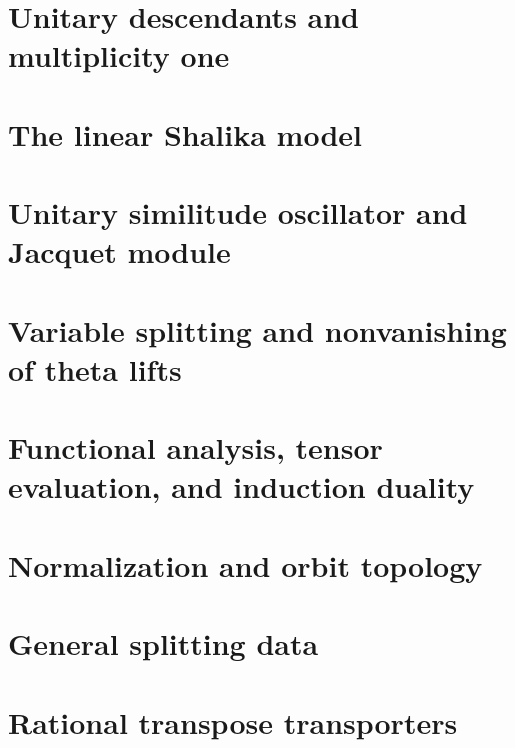 \documentclass[11pt,reqno]{amsart}
\begin{document}
\section{Unitary descendants and multiplicity one}\label{sec:unitary-descendants}

\section{The linear Shalika model}\label{sec:gl-shalika}

\section{Unitary similitude oscillator and Jacquet module}\label{sec:gu-transfer}

\section{Variable splitting and nonvanishing of theta lifts}\label{sec:gu-coverage}

\appendix
\section{Functional analysis, tensor evaluation, and induction duality}\label{app:functional}

\section{Normalization and orbit topology}\label{app:normalization}

\section{General splitting data}\label{app:splitting}

\section{Rational transpose transporters}\label{app:transporters}



\end{document}
